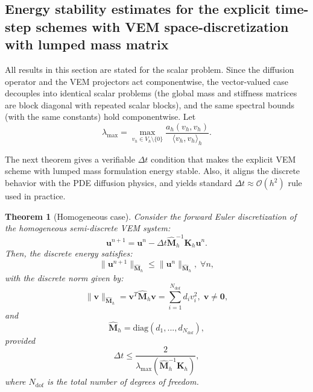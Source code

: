 \documentclass{article}
\newtheorem{theo}{Theorem}[section]
\renewcommand{\u}{\mathbf{u}}
\newcommand{\K}{\mathbf{K}_h}
\newcommand{\M}{\hat{\mathbf{M}}_h}
\begin{document}
\subsection{Energy stability estimates for the explicit time-step schemes with VEM space-discretization with lumped mass matrix}
\label{sec:stability_estimates}

All results in this section are stated for the scalar problem. Since the diffusion operator and the VEM projectors act componentwise, the vector-valued case decouples into identical scalar problems (the global mass and stiffness matrices are block diagonal with repeated scalar blocks), and the same spectral bounds (with the same constants) hold componentwise. Let
\begin{equation}
    \nonumber
    \lambda_{\max} = \max_{v_h \in V_h \setminus \{0\}} \frac{a_h(v_h, v_h)}{\langle v_h, v_h \rangle_h}.
\end{equation}

The next theorem gives a verifiable $\Delta t$ condition that makes the explicit VEM scheme with lumped mass formulation energy stable. Also, it aligns the discrete behavior with the PDE diffusion physics, and yields standard $\Delta t \approx \mathcal{O}(h^2)$ rule used in practice.

\begin{theo}[Homogeneous case]\label{theo:homogeneous_case}
    Consider the forward Euler discretization of the homogeneous semi-discrete VEM system:
    \begin{equation}
    \nonumber
        \u^{n+1} = \u^n - \Delta t \M^{-1}\K \u^n.
    \end{equation}
    Then, the discrete energy satisfies:
    \begin{equation}
    \nonumber
        \| \u^{n+1} \|_{\M} \leq \| \u^n \|_{\M}, \; \forall n,
    \end{equation}
    with the discrete norm given by:
    \begin{equation}
    \nonumber
        \| \mathbf{v} \|_{\M} = \mathbf{v}^T \M \mathbf{v}= \sum \limits^{N_{\text{dof}}}_{i=1} d_i v_i^2, \; \mathbf{v} \neq \mathbf{0},
    \end{equation}
    and
    \begin{equation}
    \nonumber
        \M = \text{diag} (d_1, ..., d_{N_{\text{dof}}}),
    \end{equation}
    provided
    \begin{equation}
    \nonumber
        \Delta t \leq \frac{2}{\lambda_{\max}\left(\M^{-1}\K\right)},
    \end{equation}
    where $N_{\text{dof}}$ is the total number of degrees of freedom.
\end{theo}
\end{document}
